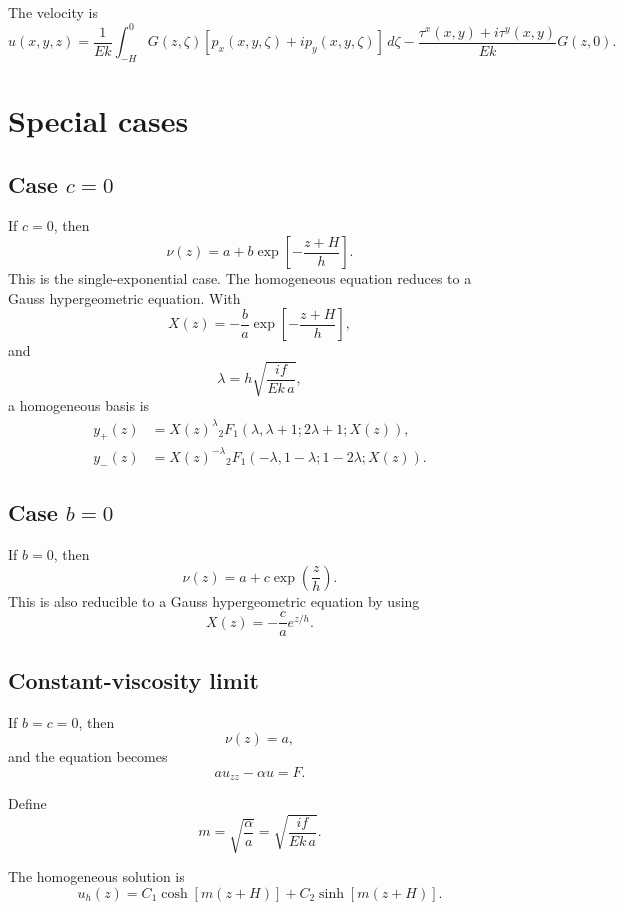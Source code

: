 \documentclass[10pt]{amsart}
\begin{document}
The velocity is
\begin{equation}
\boxed{
u(x,y,z)
=
\frac{1}{E k}
\int_{-H}^{0}
G(z,\zeta)
\left[
p_x(x,y,\zeta)+i p_y(x,y,\zeta)
\right]\,d\zeta
-
\frac{\tau^x(x,y)+i\tau^y(x,y)}{E k}G(z,0).
}
\end{equation}

\section{Special cases}

\subsection{Case \(c=0\)}

If \(c=0\), then
\[
\nu(z)=a+b\exp\!\left[-\frac{z+H}{h}\right].
\]
This is the single-exponential case. The homogeneous equation reduces to a Gauss hypergeometric equation. With
\[
X(z)
=
-\frac{b}{a}
\exp\!\left[-\frac{z+H}{h}\right],
\]
and
\[
\lambda
=
h\sqrt{\frac{i f}{E k\,a}},
\]
a homogeneous basis is
\begin{align}
y_+(z)
&=
X(z)^\lambda
{}_2F_1
\left(
\lambda,\lambda+1;2\lambda+1;X(z)
\right),
\\[0.5em]
y_-(z)
&=
X(z)^{-\lambda}
{}_2F_1
\left(
-\lambda,1-\lambda;1-2\lambda;X(z)
\right).
\end{align}

\subsection{Case \(b=0\)}

If \(b=0\), then
\[
\nu(z)=a+c\exp\!\left(\frac{z}{h}\right).
\]
This is also reducible to a Gauss hypergeometric equation by using
\[
X(z)
=
-\frac{c}{a}e^{z/h}.
\]

\subsection{Constant-viscosity limit}

If \(b=c=0\), then
\[
\nu(z)=a,
\]
and the equation becomes
\begin{equation}
a u_{zz}-\alpha u=F.
\end{equation}

Define
\begin{equation}
m=\sqrt{\frac{\alpha}{a}}
=
\sqrt{\frac{i f}{E k\,a}}.
\end{equation}

The homogeneous solution is
\begin{equation}
u_h(z)
=
C_1\cosh\!\left[m(z+H)\right]
+
C_2\sinh\!\left[m(z+H)\right].
\end{equation}
\end{document}
